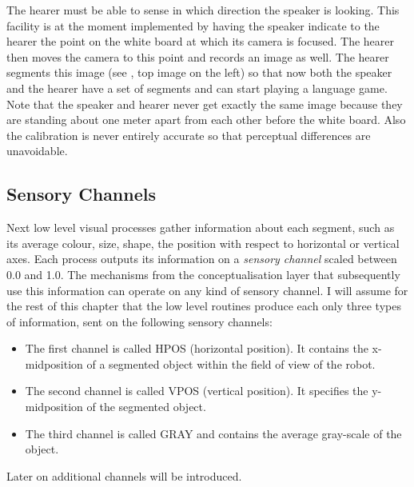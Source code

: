 The hearer must be able to sense in which direction the speaker is looking. 
This facility is at the moment implemented by having 
the speaker indicate to the hearer the point on the white board 
at which its camera is focused. The hearer then moves the camera
to this point and records an image as well. The hearer segments 
this image (see , top image on the left) so that 
now both the speaker 
and the hearer have a set of segments and can start playing 
a language game. Note that the speaker and hearer never get 
exactly the same image because they are standing about one 
meter apart from each other before the white board. Also the
calibration is never entirely accurate so that perceptual 
differences are unavoidable.

\subsection{Sensory Channels}

Next low level visual processes gather information about each 
segment, such as its average colour, size, shape,
the position with respect to horizontal or vertical axes. 
Each process outputs its information on a {\it sensory 
channel} scaled between 0.0 and 1.0. The mechanisms from 
the conceptualisation layer that subsequently use this information
can operate on any kind of sensory channel. 
I will assume for the rest of this chapter that the low level
routines produce each only three types of information, sent
on the following sensory channels: 
\begin{itemize}
\item The first channel is called HPOS (horizontal position). 
It contains the x-midposition of a segmented object within
the field of view of the robot. 
\item The second channel is called VPOS (vertical position). It
specifies the y-midposition of the segmented object. 
\item The third channel is called GRAY and contains 
the average gray-scale of the object. 
\end{itemize}
Later on additional channels will be introduced. 

